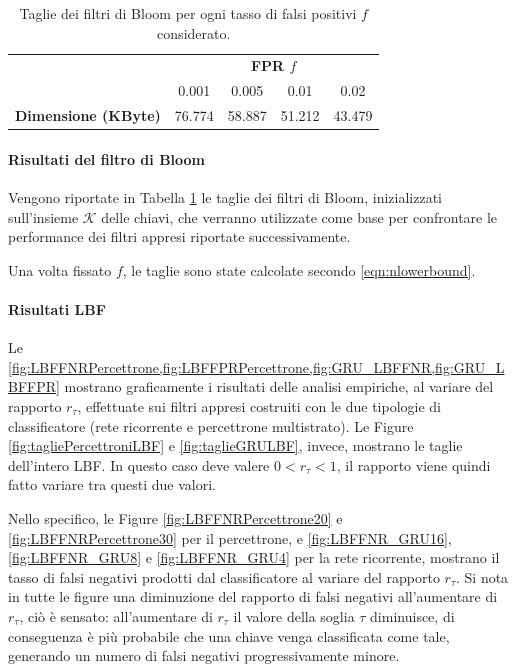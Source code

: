\documentclass[../../main.tex]{subfiles}
\begin{document}
    \begin{table}[t]
        \centering
        \begin{tabular}{lcccc}
            \toprule
            {} & \multicolumn{4}{c}{\textbf{FPR $f$}}\\
            {} & 0.001 & 0.005 & 0.01 & 0.02\\
            \midrule
            \textbf{Dimensione (KByte)} & 76.774 & 58.887 & 51.212 & 43.479\\
            \bottomrule
        \end{tabular}
        \caption{Taglie dei filtri di Bloom per ogni tasso di falsi positivi $f$ considerato.}
        \label{tab:taglieFiltro}
    \end{table}

    \paragraph{Risultati del filtro di Bloom}

    Vengono riportate in Tabella \ref{tab:taglieFiltro} le taglie dei filtri di Bloom, inizializzati sull'insieme $\mathcal{K}$ delle chiavi, che verranno utilizzate come base per confrontare le performance dei filtri appresi riportate successivamente.

    Una volta fissato $f$, le taglie sono state calcolate secondo \eqref{eqn:nlowerbound}.

    \paragraph{Risultati LBF}
    Le \cref{fig:LBFFNRPercettrone,fig:LBFFPRPercettrone,fig:GRU_LBFFNR,fig:GRU_LBFFPR} mostrano graficamente i risultati delle analisi empiriche, al variare del rapporto $r_{\tau}$, effettuate sui filtri appresi costruiti con le due tipologie di classificatore (rete ricorrente e percettrone multistrato). Le Figure \ref{fig:tagliePercettroniLBF} e \ref{fig:taglieGRULBF}, invece, mostrano le taglie dell'intero LBF. In questo caso deve valere $0 < r_{\tau} < 1$, il rapporto viene quindi fatto variare tra questi due valori.

    Nello specifico, le Figure \ref{fig:LBFFNRPercettrone20} e \ref{fig:LBFFNRPercettrone30} per il percettrone, e \ref{fig:LBFFNR_GRU16}, \ref{fig:LBFFNR_GRU8} e \ref{fig:LBFFNR_GRU4} per la rete ricorrente, mostrano il tasso di falsi negativi prodotti dal classificatore al variare del rapporto $r_{\tau}$. Si nota in tutte le figure una diminuzione del rapporto di falsi negativi all'aumentare di $r_{\tau}$, ciò è sensato: all'aumentare di $r_{\tau}$ il valore della soglia $\tau$ diminuisce, di conseguenza è più probabile che una chiave venga classificata come tale, generando un numero di falsi negativi progressivamente minore.
\end{document}
